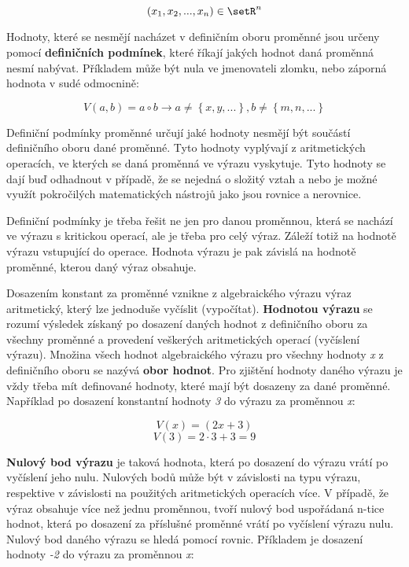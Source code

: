 $$ (x_1, x_2, ... , x_n) \in \setR^n $$

Hodnoty, které se nesmějí nacházet v definičním oboru proměnné jsou určeny pomocí {\bf definičních podmínek}, které říkají jakých hodnot daná proměnná nesmí nabývat. Příkladem může být nula ve jmenovateli zlomku, nebo záporná hodnota v sudé odmocnině:

$$ V(a, b) = a \circ b \rightarrow a \not = \left\{x, y, ... \right\}, b \not = \left\{ m, n, ...\right\} $$


Definiční podmínky proměnné určují jaké hodnoty nesmějí být součástí definičního oboru dané proměnné. Tyto hodnoty vyplývají z aritmetických operacích, ve kterých se daná proměnná ve výrazu vyskytuje. Tyto hodnoty se dají buď odhadnout v případě, že se nejedná o složitý vztah a nebo je možné využít pokročilých matematických nástrojů jako jsou rovnice a nerovnice. 

Definiční podmínky je třeba řešit ne jen pro danou proměnnou, která se nachází ve výrazu s kritickou operací, ale je třeba pro celý výraz. Záleží totiž na hodnotě výrazu vstupující do operace. Hodnota výrazu je pak závislá na hodnotě proměnné, kterou daný výraz obsahuje.



Dosazením konstant za proměnné vznikne z algebraického výrazu výraz aritmetický, který lze jednoduše vyčíslit (vypočítat). {\bf Hodnotou výrazu} se rozumí výsledek získaný po dosazení daných hodnot z definičního oboru za všechny proměnné a provedení veškerých aritmetických operací (vyčíslení výrazu). Množina všech hodnot algebraického výrazu pro všechny hodnoty {\it x} z definičního oboru se nazývá {\bf obor hodnot}. Pro zjištění hodnoty daného výrazu je vždy třeba mít definované hodnoty, které mají být dosazeny za dané proměnné. Například po dosazení konstantní hodnoty {\it 3} do výrazu za proměnnou {\it x}:

$$ V(x) = (2x + 3) $$ 
$$ V(3) = 2\cdot 3 + 3 = 9 $$

{\bf Nulový bod výrazu} je taková hodnota, která po dosazení do výrazu vrátí po vyčíslení jeho nulu. Nulových bodů může být v závislosti na typu výrazu, respektive v závislosti na použitých aritmetických operacích více. V případě, že výraz obsahuje více než jednu proměnnou, tvoří nulový bod uspořádaná n-tice hodnot, která po dosazení za příslušné proměnné vrátí po vyčíslení výrazu nulu. Nulový bod daného výrazu se hledá pomocí rovnic. Příkladem je dosazení hodnoty {\it -2} do výrazu za proměnnou {\it x}:

